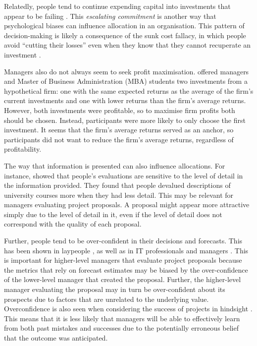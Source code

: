 \documentclass[a4paper, nobind]{templates/ociamthesis}
\theoremstyle{definition}
\theoremstyle{definition}
\theoremstyle{definition}
\theoremstyle{definition}
\theoremstyle{remark}
\begin{document}
Relatedly, people tend to continue expending capital into investments that
appear to be failing \autocite{staw1981}. This \emph{escalating commitment} is another way
that psychological biases can influence allocation in an organisation. This
pattern of decision-making is likely a consequence of the sunk cost fallacy, in
which people avoid ``cutting their losses'' even when they know that they cannot
recuperate an investment \autocite{parayre1995}.

Managers also do not always seem to seek profit maximisation. \textcite{shapira2014}
offered managers and Master of Business Administration (MBA) students two
investments from a hypothetical firm: one with the same expected returns as the
average of the firm's current investments and one with lower returns than the
firm's average returns. However, both investments were profitable, so to
maximise firm profits both should be chosen. Instead, participants were more
likely to only choose the first investment. It seems that the firm's average
returns served as an anchor, so participants did not want to reduce the firm's
average returns, regardless of profitability.

The way that information is presented can also influence allocations. For
instance, \textcite{yates1978} showed that people's evaluations are sensitive to the level
of detail in the information provided. They found that people devalued
descriptions of university courses more when they had less detail. This may be
relevant for managers evaluating project proposals. A proposal might appear more
attractive simply due to the level of detail in it, even if the level of detail
does not correspond with the quality of each proposal.

Further, people tend to be over-confident in their decisions and forecasts. This
has been shown in laypeople \autocite{langer1975,mannes2013,soll2004,puri2007}, as
well as in IT professionals \autocite{mckenzie2008} and managers \autocite{lovallo2003,kahneman1993,baroneadesi2013}. This is important for higher-level managers
that evaluate project proposals because the metrics that rely on forecast
estimates may be biased by the over-confidence of the lower-level manager that
created the proposal. Further, the higher-level manager evaluating the proposal
may in turn be over-confident about its prospects due to factors that are
unrelated to the underlying value. Overconfidence is also seen when considering
the success of projects in hindsight \autocite{bukszar1988,christensenszalanski1991}.
This means that it is less likely that managers will be able to effectively
learn from both past mistakes and successes due to the potentially erroneous
belief that the outcome was anticipated.
\end{document}
